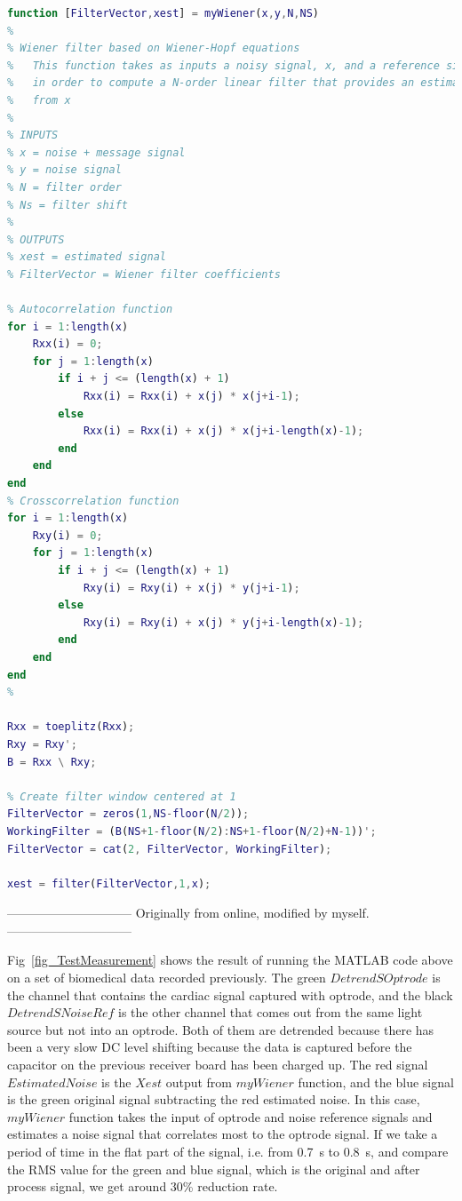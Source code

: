 \begin{lstlisting}[language=matlab]
function [FilterVector,xest] = myWiener(x,y,N,NS)
%
% Wiener filter based on Wiener-Hopf equations
%   This function takes as inputs a noisy signal, x, and a reference signal, y,
%   in order to compute a N-order linear filter that provides an estimate of y
%   from x
%  
% INPUTS
% x = noise + message signal
% y = noise signal
% N = filter order
% Ns = filter shift
%
% OUTPUTS
% xest = estimated signal
% FilterVector = Wiener filter coefficients

% Autocorrelation function
for i = 1:length(x)
    Rxx(i) = 0;
    for j = 1:length(x)
        if i + j <= (length(x) + 1)
            Rxx(i) = Rxx(i) + x(j) * x(j+i-1);
        else
            Rxx(i) = Rxx(i) + x(j) * x(j+i-length(x)-1);
        end
    end
end
% Crosscorrelation function
for i = 1:length(x)
    Rxy(i) = 0;
    for j = 1:length(x)
        if i + j <= (length(x) + 1)
            Rxy(i) = Rxy(i) + x(j) * y(j+i-1);
        else
            Rxy(i) = Rxy(i) + x(j) * y(j+i-length(x)-1);
        end
    end
end
%

Rxx = toeplitz(Rxx);
Rxy = Rxy';
B = Rxx \ Rxy;

% Create filter window centered at 1
FilterVector = zeros(1,NS-floor(N/2));
WorkingFilter = (B(NS+1-floor(N/2):NS+1-floor(N/2)+N-1))';
FilterVector = cat(2, FilterVector, WorkingFilter);

xest = filter(FilterVector,1,x);
\end{lstlisting}

------------------------------
Originally from online, modified by myself.
------------------------------

Fig~\ref{fig_TestMeasurement} shows the result of running the MATLAB code above on a set of biomedical data recorded previously.  The green $Detrend SOptrode$ is the channel that contains the cardiac signal captured with optrode, and the black $ Detrend SNoiseRef$ is the other channel that comes out from the same light source but not into an optrode.  Both of them are detrended because there has been a very slow DC level shifting because the data is captured before the capacitor on the previous receiver board has been charged up.  The red signal $Estimated Noise$ is the $Xest$ output from $myWiener$ function, and the blue signal is the green original signal subtracting the red estimated noise.  In this case, $myWiener$ function takes the input of optrode and noise reference signals and estimates a noise signal that correlates most to the optrode signal.  If we take a period of time in the flat part of the signal, i.e. from \qty{0.7}{s} to \qty{0.8}{s}, and compare the RMS value for the green and blue signal, which is the original and after process signal, we get around 30\% reduction rate.  


